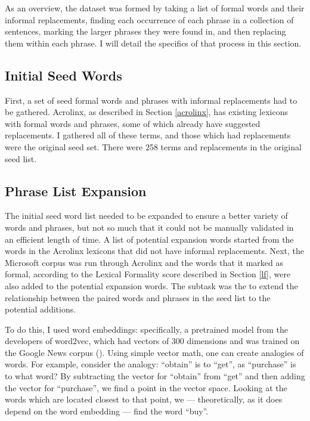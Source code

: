 As an overview, the dataset was formed by taking a list of formal words and their informal replacements, finding each occurrence of each phrase in a collection of sentences, marking the larger phrases they were found in, and then replacing them within each phrase. I will detail the specifics of that process in this section.

\subsection{Initial Seed Words}

First, a set of seed formal words and phrases with informal replacements had to be gathered. Acrolinx, as described in Section \ref{acrolinx}, has existing lexicons with formal words and phrases, some of which already have suggested replacements. I gathered all of these terms, and those which had replacements were the original seed set. There were 258 terms and replacements in the original seed list.

\subsection{Phrase List Expansion}

The initial seed word list needed to be expanded to ensure a better variety of words and phrases, but not so much that it could not be manually validated in an efficient length of time. A list of potential expansion words started from the words in the Acrolinx lexicons that did not have informal replacements. Next, the Microsoft corpus was run through Acrolinx and the words that it marked as formal, according to the Lexical Formality score described in Section \ref{lf}, were also added to the potential expansion words. The subtask was the to extend the relationship between the paired words and phrases in the seed list to the potential additions.

To do this, I used word embeddings: specifically, a pretrained model from the developers of word2vec, which had vectors of 300 dimensions and was trained on the Google News corpus (\cite{mikolov2013word2vec}). Using simple vector math, one can create analogies of words. For example, consider the analogy: ``obtain'' is to ``get'', as ``purchase'' is to what word? By subtracting the vector for ``obtain'' from ``get'' and then adding the vector for ``purchase'', we find a point in the vector space. Looking at the words which are located closest to that point, we --- theoretically, as it does depend on the word embedding --- find the word ``buy''.

